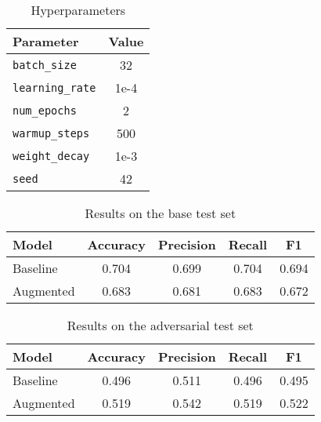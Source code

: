 \documentclass[10pt]{article}
\begin{document}
\begin{table*}[h]
      \centering
      \caption{Hyperparameters} \label{tab:hyperparameters}
      \begin{tabularx}{0.4\linewidth}{|X|c|}
            \hline
            \textbf{Parameter}      & \textbf{Value} \\
            \hline
            \hline
            \texttt{batch\_size}    & 32             \\
            \texttt{learning\_rate} & 1e-4           \\
            \texttt{num\_epochs}    & 2              \\
            \texttt{warmup\_steps}  & 500            \\
            \texttt{weight\_decay}  & 1e-3           \\
            \texttt{seed}           & 42             \\
            \hline
      \end{tabularx}
\end{table*}

\begin{table*}[h]
      \centering
      \caption{Results on the base test set} \label{tab:results_base}
      \begin{tabularx}{0.65\linewidth}{|X|c|c|c|c|}
            \hline
            \textbf{Model} & \textbf{Accuracy} & \textbf{Precision} & \textbf{Recall} & \textbf{F1} \\
            \hline
            \hline
            Baseline       & 0.704             & 0.699              & 0.704           & 0.694       \\
            Augmented      & 0.683             & 0.681              & 0.683           & 0.672       \\
            \hline
      \end{tabularx}
\end{table*}

\begin{table*}[h]
      \centering
      \caption{Results on the adversarial test set} \label{tab:results_adv}
      \begin{tabularx}{0.65\linewidth}{|X|c|c|c|c|}
            \hline
            \textbf{Model} & \textbf{Accuracy} & \textbf{Precision} & \textbf{Recall} & \textbf{F1} \\
            \hline
            \hline
            Baseline       & 0.496             & 0.511              & 0.496           & 0.495       \\
            Augmented      & 0.519             & 0.542              & 0.519           & 0.522       \\
            \hline
      \end{tabularx}
\end{table*}

\clearpage


\end{document}
